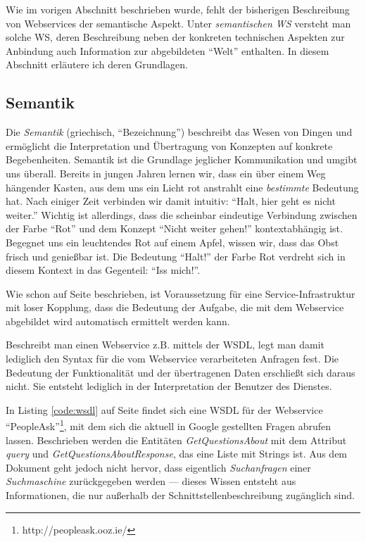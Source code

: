 Wie im vorigen Abschnitt beschrieben wurde, fehlt der bisherigen Beschreibung von Webservices der semantische Aspekt. Unter \emph{semantischen \acl{WS}} versteht man solche \acl{WS}, deren Beschreibung neben der konkreten technischen Aspekten zur Anbindung auch Information zur abgebildeten "`Welt"' enthalten. In diesem Abschnitt erläutere ich deren Grundlagen.

\subsection{Semantik}

Die \emph{Semantik} (griechisch, "`Bezeichnung"') beschreibt das Wesen von Dingen und ermöglicht die Interpretation und Übertragung von Konzepten auf konkrete Begebenheiten. Semantik ist die Grundlage jeglicher Kommunikation und umgibt uns überall. Bereits in jungen Jahren lernen wir, dass ein über einem Weg hängender Kasten, aus dem uns ein Licht rot anstrahlt eine \emph{bestimmte} Bedeutung hat. Nach einiger Zeit verbinden wir damit intuitiv: "`Halt, hier geht es nicht weiter."' Wichtig ist allerdings, dass die scheinbar eindeutige Verbindung zwischen der Farbe "`Rot"' und dem Konzept "`Nicht weiter gehen!"' kontextabhängig ist. Begegnet uns ein leuchtendes Rot auf einem Apfel, wissen wir, dass das Obst frisch und genießbar ist. Die Bedeutung "`Halt!"' der Farbe Rot verdreht sich in diesem Kontext in das Gegenteil: "`Iss mich!"'.

Wie schon auf Seite \pageref{l:intro-loosecoupling} beschrieben, ist Voraussetzung für eine Service-Infrastruktur mit loser Kopplung, dass die Bedeutung der Aufgabe, die mit dem Webservice abgebildet wird automatisch ermittelt werden kann.

Beschreibt man einen Webservice z.B. mittels der \ac{WSDL}, legt man damit lediglich den Syntax für die vom Webservice verarbeiteten Anfragen fest. Die Bedeutung der Funktionalität und der übertragenen Daten erschließt sich daraus nicht. Sie entsteht lediglich in der Interpretation der Benutzer des Dienstes. 

In Listing \ref{code:wsdl} auf Seite \pageref{code:wsdl} findet sich eine \ac{WSDL} für der Webservice "`PeopleAsk"'\footnote{http://peopleask.ooz.ie/}, mit dem sich die aktuell in Google gestellten Fragen abrufen lassen. Beschrieben werden die Entitäten \emph{GetQuestionsAbout} mit dem Attribut \emph{query} und \emph{GetQuestionsAboutResponse}, das eine Liste mit Strings ist. Aus dem Dokument geht jedoch nicht hervor, dass eigentlich \emph{Suchanfragen} einer \emph{Suchmaschine} zurückgegeben werden --- dieses Wissen entsteht aus Informationen, die nur außerhalb der Schnittstellenbeschreibung zugänglich sind.


